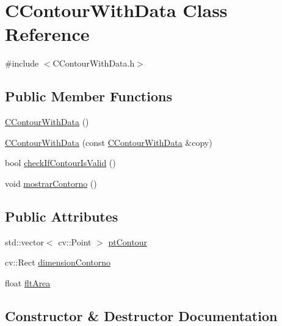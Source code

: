 \hypertarget{classCContourWithData}{}\section{C\+Contour\+With\+Data Class Reference}
\label{classCContourWithData}


{\ttfamily \#include $<$C\+Contour\+With\+Data.\+h$>$}

\subsection*{Public Member Functions}
\begin{DoxyCompactItemize}
\item 
\hyperlink{classCContourWithData_a209af0add40f7b312b5bf72c7e9d47b7}{C\+Contour\+With\+Data} ()
\item 
\hyperlink{classCContourWithData_a756d63b5e03e8809531f13c3231a5c3b}{C\+Contour\+With\+Data} (const \hyperlink{classCContourWithData}{C\+Contour\+With\+Data} \&copy)
\item 
bool \hyperlink{classCContourWithData_aee393fc1557ce93c93fa16cba9a0f457}{check\+If\+Contour\+Is\+Valid} ()
\item 
void \hyperlink{classCContourWithData_adc8d62ef51d181ee9bf36b250dc14990}{mostrar\+Contorno} ()
\end{DoxyCompactItemize}
\subsection*{Public Attributes}
\begin{DoxyCompactItemize}
\item 
std\+::vector$<$ cv\+::\+Point $>$ \hyperlink{classCContourWithData_ace345d75058a013dc37f3b020736c383}{pt\+Contour}
\item 
cv\+::\+Rect \hyperlink{classCContourWithData_a42c9ccab08cb833ecfb7f4b2a3d9a371}{dimension\+Contorno}
\item 
float \hyperlink{classCContourWithData_a065c8525870170a4ce67c7428b3c6cff}{flt\+Area}
\end{DoxyCompactItemize}


\subsection{Constructor \& Destructor Documentation}
